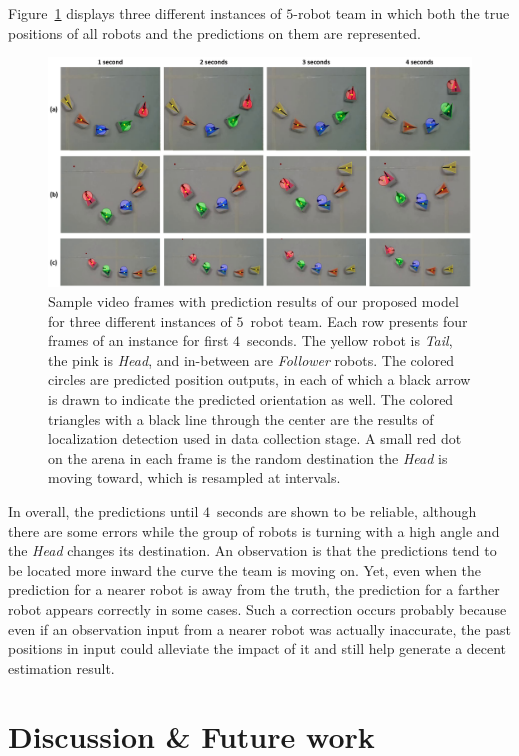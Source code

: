 \documentclass[letterpaper, 10 pt, conference]{ieeeconf}  %
\begin{document}
    Figure~\ref{fig:preds} displays three different instances of
    $5$-robot team in which both the true positions of all robots and
    the predictions on them are represented.
	\begin{figure}[t]
		\centering
		\includegraphics[width=2.\columnwidth]{fig_preds}
		\caption{Sample video frames with prediction results of our proposed model
			for three different instances of $5$~robot team.
			Each row presents four frames of an instance for first $4$~seconds.
			The yellow robot is \emph{Tail}, the pink is \emph{Head}, and
			in-between are \emph{Follower} robots.
			The colored circles are predicted position outputs, in each
			of which a black arrow is drawn to indicate the predicted orientation as well.
			The colored triangles with a black line through the center are the
			results of localization detection used in data collection stage.
			A small red dot on the arena in each frame is the random destination the
			\emph{Head} is moving toward, which is resampled at intervals.
		}
		\label{fig:preds}
	\end{figure}
    In overall, the predictions until $4$~seconds are shown to be
    reliable, although there are some errors while the group of robots
    is turning with a high angle and the \emph{Head} changes its
    destination. An observation is that the predictions tend to be
    located more inward the curve the team is moving on. Yet, even when
    the prediction for a nearer robot is away from the truth, the
    prediction for a farther robot appears correctly in some cases. Such
    a correction occurs probably because even if an observation input
    from a nearer robot was actually inaccurate, the past positions in
    input could alleviate the impact of it and still help generate a
    decent estimation result.

	\section{Discussion \& Future work}
	\label{sec:discussion_and_future_work}
\end{document}
